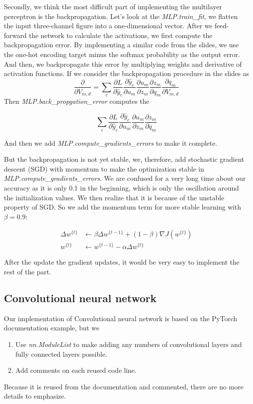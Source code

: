 \documentclass[11pt]{scrartcl}
\begin{document}
Secondly, we think the most difficult part of implementing the multilayer perceptron is the backpropagation. Let's look at the \textit{MLP.train\_fit}, we flatten the input three-channel figure into a one-dimensional vector. After we feed-forward the network to calculate the activations, we first compute the backpropagation error. By implementing a similar code from the slides, we use the one-hot encoding target minus the softmax probability as the output error. And then, we backpropagate this error by multiplying weights and derivative of activation functions. If we consider the backpropagation procedure in the slides as
\begin{equation*}
	\frac{\partial}{\partial V_{m,d}} = \sum_{c} \frac{\partial L}{\partial \hat{y}_c} \frac{\partial \hat{y}_c}{\partial u_m} \frac{\partial u_m}{\partial z_m} \frac{\partial z_m}{\partial q_m} \frac{\partial q_m}{\partial V_{m,d}}
\end{equation*}
Then \textit{MLP.back\_propgation\_error} computes the 

$$\sum_{c} \frac{\partial L}{\partial \hat{y}_c} \frac{\partial \hat{y}_c}{\partial u_m} \frac{\partial u_m}{\partial z_m} \frac{\partial z_m}{\partial q_m}$$

And then we add \textit{MLP.compute\_gradients\_errors} to make it complete. 

But the backpropagation is not yet stable, we, therefore, add stochastic gradient descent (SGD) with momentum to make the optimization stable in \textit{MLP.compute\_gradients\_errors}. We are confused for a very long time about our accuracy as it is only 0.1 in the beginning, which is only the oscillation around the initialization values. We then realize that it is because of the unstable property of SGD. So we add the momentum term for more stable learning with $\beta = 0.9$:

\begin{align*}
	\Delta w^{\{t\}} & \gets \beta \Delta w^{\{t-1\}} + (1-\beta) \nabla J (w^{\{t\}})\\
	w^{\{t\}} & \gets w^{\{t-1\}} - \alpha \Delta w^{\{t\}}
\end{align*}

After the update the gradient updates, it would be very easy to implement the rest of the part.

\subsection{Convolutional neural network}
Our implementation of Convolutional neural network is based on the PyTorch documentation example, but we
\begin{enumerate}[(1)]
	\item Use \textit{nn.ModuleList} to make adding any numbers of convolutional layers and fully connected layers possible.
	\item Add comments on each reused code line. 
\end{enumerate}
Because it is reused from the documentation and commented, there are no more details to emphasize.
\end{document}

